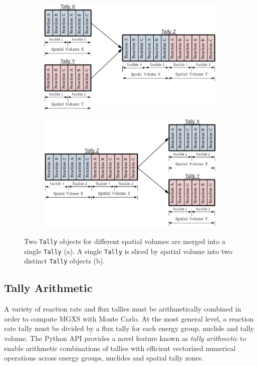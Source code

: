 \begin{figure}
\begin{subfigure}{\textwidth}
  \centering
  \includegraphics[width=0.6\linewidth]{figures/tally-merge}
  \caption{}
\end{subfigure}
\begin{subfigure}{\textwidth}
  \centering
  \includegraphics[width=0.6\linewidth]{figures/tally-slice}
  \caption{}
\end{subfigure}
\caption{Two \texttt{Tally} objects for different spatial volumes are merged into a single \texttt{Tally} (a). A single \texttt{Tally} is sliced by spatial volume into two distinct \texttt{Tally} objects (b).}
\label{fig:tally-merge-slice}
\end{figure}

\subsection{Tally Arithmetic}
\label{subsec:tally-arithmetic}

A variety of reaction rate and flux tallies must be arithmetically combined in order to compute MGXS with Monte Carlo. At the most general level, a reaction rate tally must be divided by a flux tally for each energy group, nuclide and tally volume. The Python API provides a novel feature known as \emph{tally arithmetic} to enable arithmetic combinations of tallies with efficient vectorized numerical operations across energy groups, nuclides and spatial tally zones.

